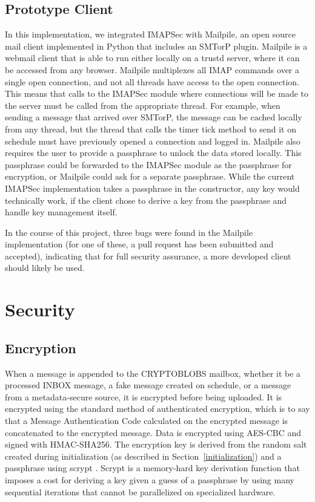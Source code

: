 \documentclass[pageno]{jpaper}
\newcommand{\project}{IMAPSec }
\begin{document}
\subsection{Prototype Client}
In this implementation, we integrated \project with Mailpile, an open source mail client implemented in Python that includes an SMTorP plugin. Mailpile is a webmail client that is able to run either locally on a trustd server, where it can be accessed from any browser. Mailpile multiplexes all IMAP commands over a single open connection, and not all threads have access to the open connection. This means that calls to the \project module where connections will be made to the server must be called from the appropriate thread. For example, when sending a message that arrived over SMTorP, the message can be cached locally from any thread, but the thread that calls the timer tick method to send it on schedule must have previously opened a connection and logged in. Mailpile also requires the user to provide a passphrase to unlock the data stored locally. This passphrase could be forwarded to the \project module as the passphrase for encryption, or Mailpile could ask for a separate passphrase. While the current \project implementation takes a passphrase in the constructor, any key would technically work, if the client chose to derive a key from the passphrase and handle key management itself.

In the course of this project, three bugs were found in the Mailpile implementation (for one of these, a pull request has been submitted and accepted), indicating that for full security assurance, a more developed client should likely be used.




\section{Security}

\label{encryption}
\subsection{Encryption}

When a message is appended to the CRYPTOBLOBS mailbox, whether it be a processed INBOX message, a fake message created on schedule, or a message from a metadata-secure source, it is encrypted before being uploaded. It is encrypted using the standard method of authenticated encryption, which is to say that a Message Authentication Code calculated on the encrypted message is concatenated to the encrypted message. Data is encrypted using AES-CBC and signed with HMAC-SHA256. The encryption key is derived from the random salt created during initialization (as described in Section~\ref{initialization}) and a passphrase using scrypt \cite{percival2009stronger}. Scrypt is a memory-hard key derivation function that imposes a cost for deriving a key given a guess of a passphrase by using many sequential iterations that cannot be parallelized on specialized hardware.
\end{document}
